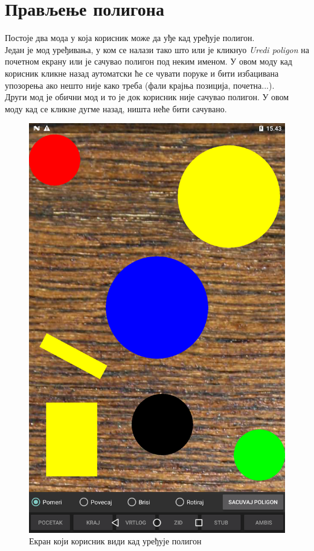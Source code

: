 \section{Прављење полигона}\label{UseCases:CreatePolygon}
Постоје два мода у која корисник може да уђе кад уређује полигон. 
\\ \indent Један је мод уређивања, у ком се налази тако што или је кликнуо \emph{Uredi poligon} на почетном екрану или је сачувао полигон под неким именом. У овом моду кад корисник кликне назад аутоматски ће се чувати поруке и бити избацивана упозорења ако нешто није како треба (фали крајња позиција, почетна...). 
\\ \indent Други мод је обични мод и то је док корисник није сачувао полигон. У овом моду кад се кликне дугме назад, ништа неће бити сачувано. 
\begin{figure}[htb!]
\begin{center}
\includegraphics[scale=.1]{pictures/createPolygon/Basic}
\caption{Екран који корисник види кад уређује полигон}\label{fig:createPolygonBasic}
\end{center}
\end{figure}

